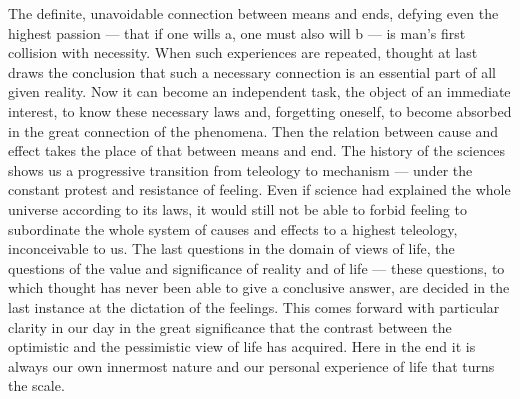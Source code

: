 \documentclass[12pt,a4paper]{book}
\newcommand{\opage}[1]{\marginnote{\footnotesize\textit{[#1]}}}
\begin{document}
The definite, unavoidable connection between means and ends, defying
even the highest passion --- that if one wills a, one must also will b
--- is man's first collision with necessity. When such experiences are
repeated, thought at last draws the conclusion that such a necessary
connection is an essential part of all given reality. Now it can become
an independent task, the object of an immediate interest, to know these
necessary laws and, forgetting oneself, to become absorbed in the great
connection of the phenomena. Then the relation between
\opage{357}cause and effect takes the place of that between means and
end. The history of the sciences shows us a progressive transition from
teleology to mechanism --- under the constant protest and resistance of
feeling. Even if science had explained the whole universe according to
its laws, it would still not be able to forbid feeling to subordinate
the whole system of causes and effects to a highest teleology,
inconceivable to us. The last questions in the domain of views of life,
the questions of the value and significance of reality and of life ---
these questions, to which thought has never been able to give a
conclusive answer, are decided in the last instance at the dictation of
the feelings. This comes forward with particular clarity in our day in
the great significance that the contrast between the optimistic and the
pessimistic view of life has acquired. Here in the end it is always our
own innermost nature and our personal experience of life that turns the
scale.
\end{document}

